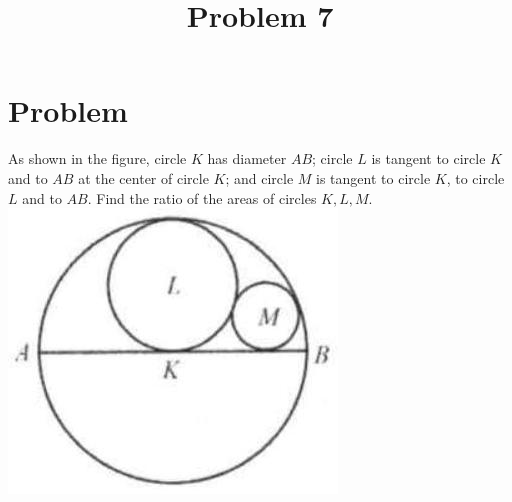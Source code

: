 \documentclass{article}
\title{Problem 7}
\date{}
\begin{document}
\maketitle

\section*{Problem}
As shown in the figure, circle \(K\) has diameter \(A B\); circle \(L\) is tangent to circle \(K\) and to \(A B\) at the center of circle \(K\); and circle \(M\) is tangent to circle \(K\), to circle \(L\) and to \(A B\). Find the ratio of the areas of circles \(K, L, M\).\\
\centering
\includegraphics[width=\textwidth]{images/problem_image_1.jpg}
\end{document}

